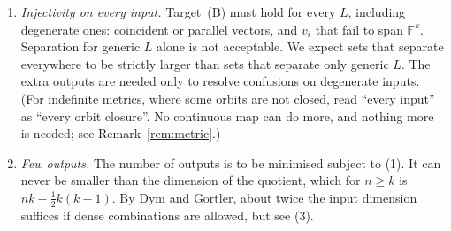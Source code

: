 \documentclass[11pt]{article}
\theoremstyle{definition}
\theoremstyle{remark}
\newcommand{\F}{\mathbb{F}}
\begin{document}
\begin{enumerate}
  \item \emph{Injectivity on every input.} Target~(B) must hold for every $L$,
    including degenerate ones: coincident or parallel vectors, and $v_i$ that
    fail to span $\F^k$. Separation for generic $L$ alone is not acceptable.
    We expect sets that separate everywhere to be strictly larger than sets that
    separate only generic $L$. The extra outputs are needed only to resolve
    confusions on degenerate inputs. (For indefinite metrics, where some orbits
    are not closed, read ``every input'' as ``every orbit closure''. No
    continuous map can do more, and nothing more is needed; see
    Remark~\ref{rem:metric}.)

  \item \emph{Few outputs.} The number of outputs is to be minimised subject to
    (1). It can never be smaller than the dimension of the quotient, which for
    $n \ge k$ is $nk - \tfrac{1}{2}k(k-1)$. By Dym and Gortler, about
    twice the input dimension suffices if dense combinations are allowed, but
    see (3).


\end{enumerate}
\end{document}
